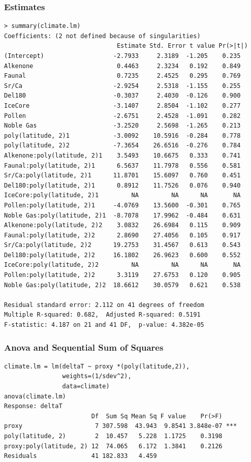 \documentclass[]{beamer}
\begin{document}
\begin{frame}[fragile]
  \frametitle{Estimates}
  \begin{tiny}
\begin{verbatim}
> summary(climate.lm)
Coefficients: (2 not defined because of singularities)
                               Estimate Std. Error t value Pr(>|t|)
(Intercept)                   -2.7933     2.3189  -1.205    0.235
Alkenone                       0.4463     2.3234   0.192    0.849
Faunal                         0.7235     2.4525   0.295    0.769
Sr/Ca                         -2.9254     2.5318  -1.155    0.255
Del180                        -0.3037     2.4030  -0.126    0.900
IceCore                       -3.1407     2.8504  -1.102    0.277
Pollen                        -2.6751     2.4528  -1.091    0.282
Noble Gas                     -3.2520     2.5698  -1.265    0.213
poly(latitude, 2)1            -3.0092    10.5916  -0.284    0.778
poly(latitude, 2)2            -7.3654    26.6516  -0.276    0.784
Alkenone:poly(latitude, 2)1    3.5493    10.6675   0.333    0.741
Faunal:poly(latitude, 2)1      6.5637    11.7978   0.556    0.581
Sr/Ca:poly(latitude, 2)1      11.8701    15.6097   0.760    0.451
Del180:poly(latitude, 2)1      0.8912    11.7526   0.076    0.940
IceCore:poly(latitude, 2)1         NA         NA      NA       NA
Pollen:poly(latitude, 2)1     -4.0769    13.5600  -0.301    0.765
Noble Gas:poly(latitude, 2)1  -8.7078    17.9962  -0.484    0.631
Alkenone:poly(latitude, 2)2    3.0832    26.6984   0.115    0.909
Faunal:poly(latitude, 2)2      2.8690    27.4056   0.105    0.917
Sr/Ca:poly(latitude, 2)2      19.2753    31.4567   0.613    0.543
Del180:poly(latitude, 2)2     16.1802    26.9623   0.600    0.552
IceCore:poly(latitude, 2)2         NA         NA      NA       NA
Pollen:poly(latitude, 2)2      3.3119    27.6753   0.120    0.905
Noble Gas:poly(latitude, 2)2  18.6612    30.0579   0.621    0.538

Residual standard error: 2.112 on 41 degrees of freedom
Multiple R-squared: 0.682,	Adjusted R-squared: 0.5191 
F-statistic: 4.187 on 21 and 41 DF,  p-value: 4.382e-05 

\end{verbatim}
  \end{tiny}
\end{frame}

\begin{frame}[fragile]
  \frametitle{Anova and Sequential Sum of Squares }
  \begin{small}
\begin{verbatim}
climate.lm = lm(deltaT ~ proxy *(poly(latitude,2)),
                weights=(1/sdev^2), 
                data=climate)
anova(climate.lm)
Response: deltaT
                        Df  Sum Sq Mean Sq F value    Pr(>F)    
proxy                    7 307.598  43.943  9.8541 3.848e-07 ***
poly(latitude, 2)        2  10.457   5.228  1.1725    0.3198    
proxy:poly(latitude, 2) 12  74.065   6.172  1.3841    0.2126    
Residuals               41 182.833   4.459  
\end{verbatim}
    
\end{small}

\end{frame}
\end{document}
